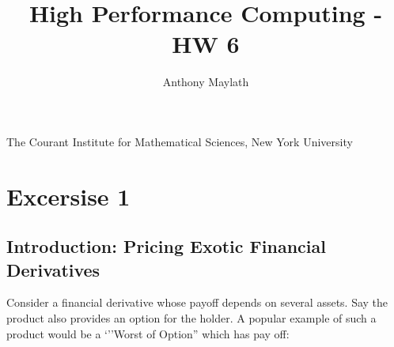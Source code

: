 \documentclass[12pt]{article}
\title{High Performance Computing - HW 6}
\author{Anthony Maylath}
\begin{document}
\maketitle

\begin{center}

The Courant Institute for Mathematical Sciences, New York University \\ 

\end{center}


\setcounter{MaxMatrixCols}{13}

\section{Excersise 1}

\subsection{Introduction: Pricing Exotic Financial Derivatives}

Consider a financial derivative whose payoff depends on several assets. Say the product also provides an option for the holder. A popular example of such a product would be a `''Worst of Option'' which has pay off:
\end{document}
